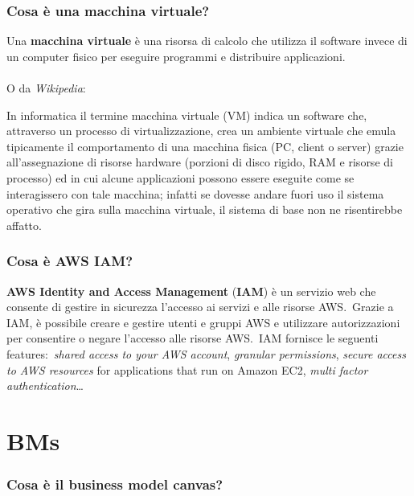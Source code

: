 \documentclass[12pt, a4paper]{article}
\begin{document}
\subsubsection*{Cosa è una macchina virtuale?}

Una \textbf{macchina virtuale} è una risorsa di calcolo che utilizza il software invece di un computer fisico per eseguire programmi e distribuire applicazioni.\
\\ \\
O da \textit{Wikipedia}:\

\noindent In informatica il termine macchina virtuale (VM) indica un software che, attraverso un processo di virtualizzazione, crea un ambiente virtuale che emula tipicamente il comportamento di una macchina fisica (PC, client o server) grazie all'assegnazione di risorse hardware (porzioni di disco rigido, RAM e risorse di processo) ed in cui alcune applicazioni possono essere eseguite come se interagissero con tale macchina; infatti se dovesse andare fuori uso il sistema operativo che gira sulla macchina virtuale, il sistema di base non ne risentirebbe affatto.

\subsubsection*{Cosa è AWS IAM?}
\textbf{AWS Identity and Access Management} (\textbf{IAM}) è un servizio web che consente di
gestire in sicurezza l'accesso ai servizi e alle risorse AWS.\
Grazie a IAM, è possibile creare e gestire utenti e gruppi AWS e utilizzare autorizzazioni per consentire o negare l'accesso alle risorse AWS.\
IAM fornisce le seguenti features:\ \textit{shared access to your AWS account}, \textit{granular permissions}, \textit{secure access to AWS resources} for applications that run on Amazon EC2, \textit{multi factor authentication}\dots

\section{BMs}

\subsubsection*{Cosa è il business model canvas?}
\end{document}
